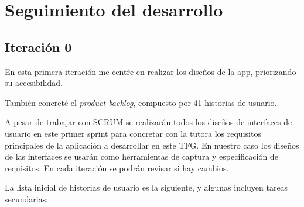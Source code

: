 \section{Seguimiento del desarrollo}

\subsection{Iteraci\'on 0}
En esta primera iteraci\'on me cent\'re en realizar los dise\~nos de la app, priorizando su accesibilidad. 

Tambi\'en concret\'e el \textit{product backlog}, compuesto por 41 historias de usuario. 

A pesar de trabajar con SCRUM se realizarán todos los diseños de interfaces de usuario en este primer sprint para concretar con la tutora los requisitos principales de la aplicación a desarrollar en este TFG. En nuestro caso los diseños de las interfaces se usarán como herramientas de captura y especificación de requisitos. En cada iteración se podrán revisar si hay cambios. 

La lista inicial de historias de usuario es la siguiente, y algunas incluyen tareas secundarias:

